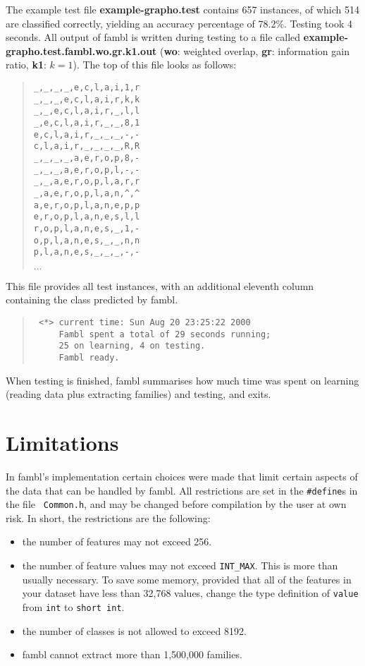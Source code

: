 \documentclass[11pt]{article}
\begin{document}
The example test file {\bf example-grapho.test} contains 657
instances, of which 514 are classified correctly, yielding an accuracy
percentage of 78.2\%. Testing took 4 seconds. All output of {\sc fambl}
is written during testing to a file called {\bf
example-grapho.test.fambl.wo.gr.k1.out} ({\bf wo}: weighted overlap,
{\bf gr}: information gain ratio, {\bf k1}: $k=1$). The top of this file
looks as follows:

\begin{quote}
{\tiny
\begin{verbatim}
_,_,_,_,e,c,l,a,i,1,r
_,_,_,e,c,l,a,i,r,k,k
_,_,e,c,l,a,i,r,_,l,l
_,e,c,l,a,i,r,_,_,8,1
e,c,l,a,i,r,_,_,_,-,-
c,l,a,i,r,_,_,_,_,R,R
_,_,_,_,a,e,r,o,p,8,-
_,_,_,a,e,r,o,p,l,-,-
_,_,a,e,r,o,p,l,a,r,r
_,a,e,r,o,p,l,a,n,^,^
a,e,r,o,p,l,a,n,e,p,p
e,r,o,p,l,a,n,e,s,l,l
r,o,p,l,a,n,e,s,_,1,-
o,p,l,a,n,e,s,_,_,n,n
p,l,a,n,e,s,_,_,_,-,-
\end{verbatim}
$\ldots$
}
\end{quote}

This file provides all test instances, with an additional eleventh
column containing the class predicted by {\sc fambl}.

\begin{quote}
{\tiny
\begin{verbatim}
 <*> current time: Sun Aug 20 23:25:22 2000
     Fambl spent a total of 29 seconds running;
     25 on learning, 4 on testing.
     Fambl ready.
\end{verbatim}
}
\end{quote}

When testing is finished, {\sc fambl} summarises how much time was
spent on learning (reading data plus extracting families) and testing,
and exits.

\section{Limitations}
\label{notes}

In {\sc fambl}'s implementation certain choices were made that limit
certain aspects of the data that can be handled by {\sc fambl}. All
restrictions are set in the {\tt \#define}s in the file {\tt
Common.h}, and may be changed before compilation by the user at own
risk. In short, the restrictions are the following:

\begin{itemize}
\item
the number of features may not exceed 256.
\item
the number of feature values may not exceed {\tt INT\_MAX}. This is
more than usually necessary. To save some memory, provided that all of
the features in your dataset have less than 32,768 values, change the
type definition of {\tt value} from {\tt int} to {\tt short int}.
\item
the number of classes is not allowed to exceed 8192.
\item
{\sc fambl} cannot extract more than 1,500,000 families.
\end{itemize}
\end{document}
